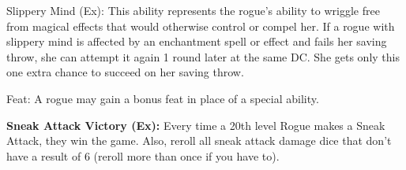 \begin{description*}
\item[Slippery Mind (Ex):] This ability represents the rogue's ability to wriggle free from magical effects that would otherwise control or compel her. If a rogue with slippery mind is affected by an enchantment spell or effect and fails her saving throw, she can attempt it again 1 round later at the same DC. She gets only this one extra chance to succeed on her saving throw.

\item[Feat:] A rogue may gain a bonus feat in place of a special ability.
\end{description*}

\textbf{Sneak Attack Victory (Ex):} Every time a 20th level Rogue makes a Sneak Attack, they win the game. Also, reroll all sneak attack damage dice that don't have a result of 6 (reroll more than once if you have to).
